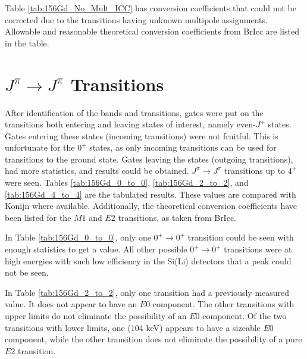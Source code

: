 \afterpage{\clearpage}

Table \ref{tab:156Gd_No_Mult_ICC} has conversion coefficients that could not be corrected due to the transitions having unknown multipole assignments. Allowable and reasonable theoretical conversion coefficients from BrIcc\citep{kibedi08:_BRICC} are listed in the table.

\afterpage{\clearpage}

\section{$J^{\pi}\rightarrow J^{\pi}$ Transitions}

After identification of the bands and transitions, gates were put on the transitions both entering and leaving states of interest, namely even-$J^+$ states. Gates entering these states (incoming transitions) were not fruitful. This is unfortunate for the $0^+$ states, as only incoming transitions can be used for transitions to the ground state. Gates leaving the states (outgoing transitions), had more statistics, and results could be obtained. $J^\pi\rightarrow J^\pi$ transitions up to $4^+$ were seen. Tables \ref{tab:156Gd_0_to_0}, \ref{tab:156Gd_2_to_2}, and \ref{tab:156Gd_4_to_4} are the tabulated results. These values are compared with Konijn\citep{konijn81:_156gd} where available. Additionally, the theoretical conversion coefficients have been listed for the $M1$ and $E2$ transitions, as taken from BrIcc\citep{kibedi08:_BRICC}.

In Table \ref{tab:156Gd_0_to_0}, only one $0^+\rightarrow0^+$ transition could be seen with enough statistics to get a value. All other possible $0^+\rightarrow0^+$ transitions were at high energies with such low efficiency in the Si(Li) detectors that a peak could not be seen.
    
\afterpage{\clearpage}

In Table \ref{tab:156Gd_2_to_2}, only one transition had a previously measured value. It does not appear to have an $E0$ component. The other transitions with upper limits do not eliminate the possibility of an $E0$ component. Of the two transitions with lower limits, one (104 keV) appears to have a sizeable $E0$ component, while the other transition does not eliminate the possibility of a pure $E2$ transition.

\afterpage{\clearpage}
   
